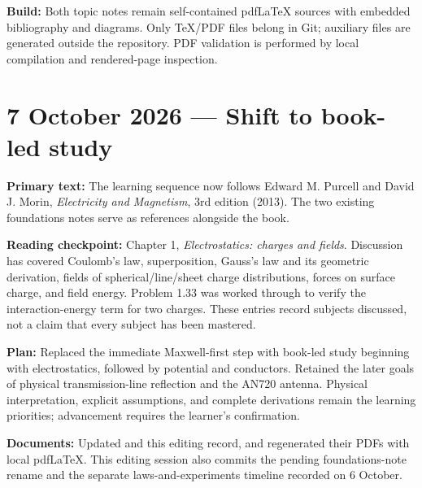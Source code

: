 \documentclass[11pt,letterpaper]{article}
\begin{document}
\textbf{Build:} Both topic notes remain self-contained pdfLaTeX sources with embedded bibliography and diagrams. Only TeX/PDF files belong in Git; auxiliary files are generated outside the repository. PDF validation is performed by local compilation and rendered-page inspection.


\newpage
\section*{7 October 2026 --- Shift to book-led study}
\textbf{Primary text:} The learning sequence now follows Edward M. Purcell and David J. Morin, \emph{Electricity and Magnetism}, 3rd edition (2013). The two existing foundations notes serve as references alongside the book.

\textbf{Reading checkpoint:} Chapter 1, \emph{Electrostatics: charges and fields}. Discussion has covered Coulomb's law, superposition, Gauss's law and its geometric derivation, fields of spherical/line/sheet charge distributions, forces on surface charge, and field energy. Problem 1.33 was worked through to verify the interaction-energy term for two charges. These entries record subjects discussed, not a claim that every subject has been mastered.

\textbf{Plan:} Replaced the immediate Maxwell-first step with book-led study beginning with electrostatics, followed by potential and conductors. Retained the later goals of physical transmission-line reflection and the AN720 antenna. Physical interpretation, explicit assumptions, and complete derivations remain the learning priorities; advancement requires the learner's confirmation.

\textbf{Documents:} Updated  and this editing record, and regenerated their PDFs with local pdfLaTeX. This editing session also commits the pending foundations-note rename and the separate laws-and-experiments timeline recorded on 6 October.
\end{document}
